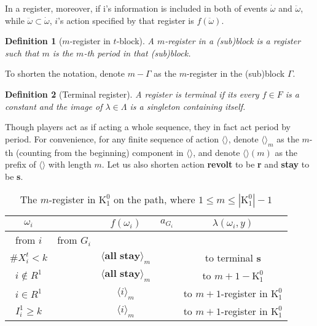 \documentclass[12pt,letter]{article}
\newcommand{\Kappa}{\mathrm{K}}
\newtheorem{definition}{Definition}[section]
\theoremstyle{definition}
\theoremstyle{remark}
\theoremstyle{claim}
\begin{document}
In a register, moreover, if i's information is included in both of events $\dot{\omega}$ and $\ddot{\omega}$, while $\ddot{\omega}\subset \dot{\omega}$, $i$'s action specified by that register is $f(\ddot{\omega})$.

\begin{definition}[$m$-register in $t$-block]
A $m$-register in a (sub)block is a register such that $m$ is the $m$-th period in that (sub)block.
\end{definition}

To shorten the notation, denote $m-\Gamma$ as the $m$-register in the (sub)block $\Gamma$.

\begin{definition}[Terminal register]
A register is terminal if its every $f\in F$ is a constant and the image of $\lambda \in \Lambda$ is a singleton containing itself. 
\end{definition}

Though players act as if acting a whole sequence, they in fact act period by period. For convenience, for any finite sequence of action $\langle \rangle$, denote $\langle \rangle_m$ as the $m$-th (counting from the beginning) component in $\langle \rangle$, and denote $\langle \rangle(m)$ as the prefix of $\langle \rangle$ with length $m$. Let us also shorten action \textbf{revolt} to be \textbf{r} and \textbf{stay} to be \textbf{s}. 
\clearpage
\noindent{\textbf{Equilibrium path in $\Kappa^0$}}

\begin{table}[!htbp]
\caption{The $m$-register in $\Kappa^0_{1}$ on the path, where $1\leq m \leq |\Kappa^0_1|-1$}
\begin{center}
\begin{tabular}{c c | c | c | c }
$\omega_i$ 	 & 	   &	$f(\omega_i)$  &	$a_{G_i}$ & $\lambda(\omega_i,y)$ \\
\hline
\hline
from $i$ 	 & from $G_i$	  & 	&	 & \\
\hline
$\# X^t_i<k$  	& 	 &$\langle \textbf{all stay} \rangle_m$ &	& to terminal \textbf{s}\\
$i\notin R^1$  	&  &$\langle \textbf{all stay} \rangle_m$ & 	& to $m+1-\Kappa^0_{1}$\\
$i\in R^1$  	& 	 &$\langle i \rangle_m$	&  &to $m+1$-register in $\Kappa^0_{1}$\\
$I^1_i\geq k$  	& 	 &$\langle i \rangle_m$	&  &to $m+1$-register in $\Kappa^0_{1}$\\
\hline
\end{tabular}
\end{center}
\end{table}
\end{document}
